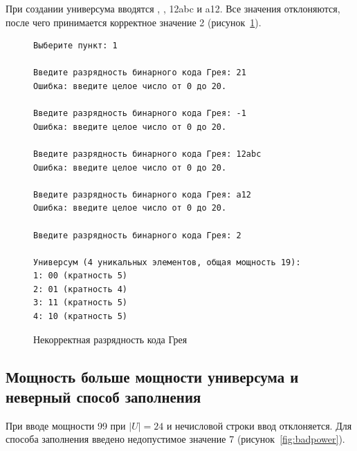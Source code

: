 \documentclass[14pt,a4paper]{extarticle}
\newcommand{\codefont}{\renewcommand{\baselinestretch}{1}\monofont\fontsize{10}{12}\selectfont}
\newcommand{\card}[1]{\left|#1\right|}
\newcommand{\code}[1]{{\monofont #1}}
\begin{document}
При создании универсума вводятся \code{21}, \code{-1}, \code{12abc} и \code{a12}. Все значения отклоняются, после чего принимается корректное значение 2 (рисунок~\ref{fig:badbits}).

\begin{figure}[H]
\begin{Verbatim}[frame=single,framesep=4pt,breaklines=true,formatcom=\codefont]
Выберите пункт: 1

Введите разрядность бинарного кода Грея: 21
Ошибка: введите целое число от 0 до 20.

Введите разрядность бинарного кода Грея: -1
Ошибка: введите целое число от 0 до 20.

Введите разрядность бинарного кода Грея: 12abc
Ошибка: введите целое число от 0 до 20.

Введите разрядность бинарного кода Грея: a12
Ошибка: введите целое число от 0 до 20.

Введите разрядность бинарного кода Грея: 2

Универсум (4 уникальных элементов, общая мощность 19):
1: 00 (кратность 5)
2: 01 (кратность 4)
3: 11 (кратность 5)
4: 10 (кратность 5)
\end{Verbatim}
\caption{Некорректная разрядность кода Грея}\label{fig:badbits}
\end{figure}

\subsection{Мощность больше мощности универсума и неверный способ заполнения}

При вводе мощности 99 при $\card{U}=24$ и нечисловой строки ввод отклоняется. Для способа заполнения введено недопустимое значение 7 (рисунок~\ref{fig:badpower}).
\end{document}
